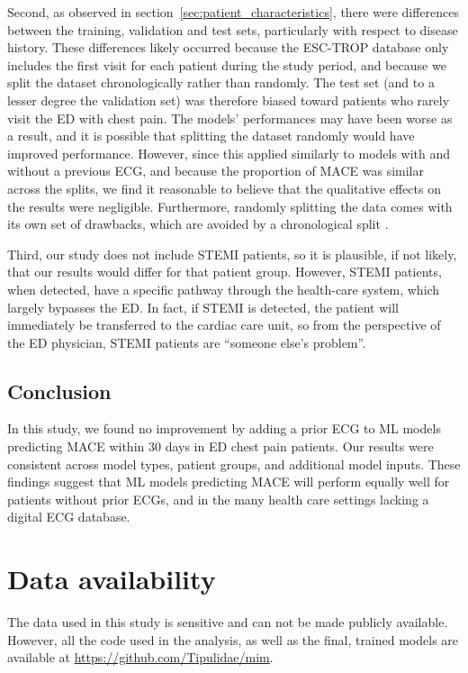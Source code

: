 \documentclass[preprint]{elsarticle}
\begin{document}
Second, as observed in section~\ref{sec:patient_characteristics}, there were differences between the training, validation and test sets, particularly with respect to disease history. These differences likely occurred because the ESC-TROP database only includes the first visit for each patient during the study period, and because we split the dataset chronologically rather than randomly. The test set (and to a lesser degree the validation set) was therefore biased toward patients who rarely visit the ED with chest pain. The models' performances may have been worse as a result, and it is possible that splitting the dataset randomly would have improved performance. However, since this applied similarly to models with and without a previous ECG, and because the proportion of MACE was similar across the splits, we find it reasonable to believe that the qualitative effects on the results were negligible. Furthermore, randomly splitting the data comes with its own set of drawbacks, which are avoided by a chronological split \citep{steyerberg2009}.

Third, our study does not include STEMI patients, so it is plausible, if not likely, that our results would differ for that patient group. However, STEMI patients, when detected, have a specific pathway through the health-care system, which largely bypasses the ED. In fact, if STEMI is detected, the patient will immediately be transferred to the cardiac care unit, so from the perspective of the ED physician, STEMI patients are ``someone else's problem''.
\subsection{Conclusion}
In this study, we found no improvement by adding a prior ECG to ML models predicting MACE within 30 days in ED chest pain patients. Our results were consistent across model types, patient groups, and additional model inputs. These findings suggest that ML models predicting MACE will perform equally well for patients without prior ECGs, and in the many health care settings lacking a digital ECG database.

\section*{Data availability}
The data used in this study is sensitive and can not be made publicly available. However, all the code used in the analysis, as well as the final, trained models are available at \url{https://github.com/Tipulidae/mim}. 
\end{document}

